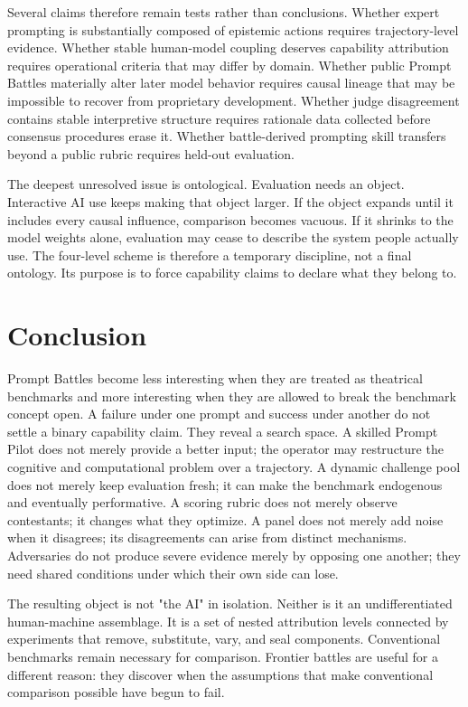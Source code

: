 \documentclass[11pt]{article}
\begin{document}
Several claims therefore remain tests rather than conclusions. Whether expert prompting is substantially composed of epistemic actions requires trajectory-level evidence. Whether stable human-model coupling deserves capability attribution requires operational criteria that may differ by domain. Whether public Prompt Battles materially alter later model behavior requires causal lineage that may be impossible to recover from proprietary development. Whether judge disagreement contains stable interpretive structure requires rationale data collected before consensus procedures erase it. Whether battle-derived prompting skill transfers beyond a public rubric requires held-out evaluation.

The deepest unresolved issue is ontological. Evaluation needs an object. Interactive AI use keeps making that object larger. If the object expands until it includes every causal influence, comparison becomes vacuous. If it shrinks to the model weights alone, evaluation may cease to describe the system people actually use. The four-level scheme is therefore a temporary discipline, not a final ontology. Its purpose is to force capability claims to declare what they belong to.

\section{Conclusion}
Prompt Battles become less interesting when they are treated as theatrical benchmarks and more interesting when they are allowed to break the benchmark concept open. A failure under one prompt and success under another do not settle a binary capability claim. They reveal a search space. A skilled Prompt Pilot does not merely provide a better input; the operator may restructure the cognitive and computational problem over a trajectory. A dynamic challenge pool does not merely keep evaluation fresh; it can make the benchmark endogenous and eventually performative. A scoring rubric does not merely observe contestants; it changes what they optimize. A panel does not merely add noise when it disagrees; its disagreements can arise from distinct mechanisms. Adversaries do not produce severe evidence merely by opposing one another; they need shared conditions under which their own side can lose.

The resulting object is not "the AI" in isolation. Neither is it an undifferentiated human-machine assemblage. It is a set of nested attribution levels connected by experiments that remove, substitute, vary, and seal components. Conventional benchmarks remain necessary for comparison. Frontier battles are useful for a different reason: they discover when the assumptions that make conventional comparison possible have begun to fail.
\end{document}

